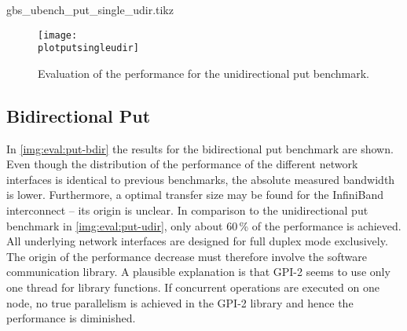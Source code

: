 \newcommand{\plotputsingleudir}{gbs_ubench_put_single_udir.tikz}
\begin{filecontents}{\plotputsingleudir}
\newcommand{\csv}{gbs_ubench_put_single_udir.csv}
\newcommand{\csvgi}{result-gi/\csv}
\newcommand{\csvte}{result-te/\csv}
\newcommand{\csvipoib}{result-ipoib/\csv}
\newcommand{\csvib}{result-ib/\csv}
\end{filecontents}

\begin{figure}[htb]
\centering
\texttt{[image: \\plotputsingleudir]}
\caption{Evaluation of the performance for the unidirectional put benchmark.}
\label{img:eval:put-udir}
\end{figure}


\subsection{Bidirectional Put}

In \autoref{img:eval:put-bdir} the results for the bidirectional put benchmark are shown. Even though the distribution of the performance of the different network interfaces is identical to previous benchmarks, the absolute measured bandwidth is lower. Furthermore, a optimal transfer size may be found for the InfiniBand interconnect -- its origin is unclear. In comparison to the unidirectional put benchmark in \autoref{img:eval:put-udir}, only about 60\,\% of the performance is achieved. All underlying network interfaces are designed for full duplex mode exclusively. The origin of the performance decrease must therefore involve the software communication library. A plausible explanation is that \ac{GPI}-2 seems to use only one thread for library functions. If concurrent operations are executed on one node, no true parallelism is achieved in the \ac{GPI}-2 library and hence the performance is diminished. 


